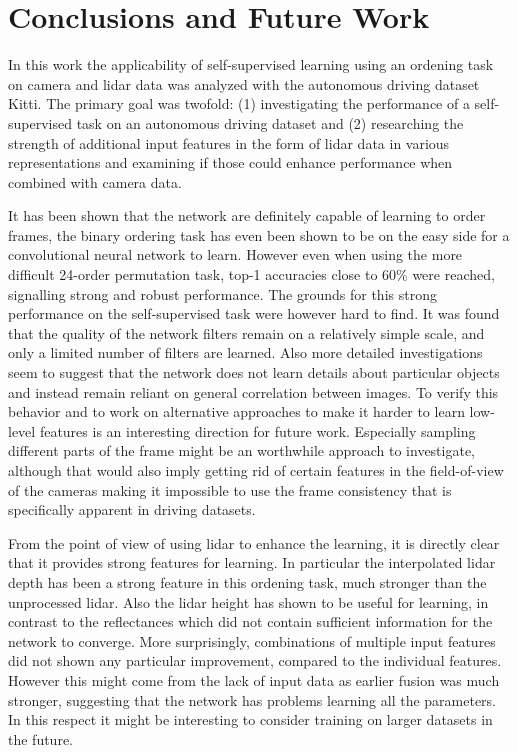 %

\chapter{Conclusions and Future Work}
\label{ch:conclusion}
In this work the applicability of self-supervised learning using an ordening task on camera and lidar data was analyzed with the autonomous driving dataset Kitti\cite{geiger2012}. The primary goal was twofold: (1) investigating the performance of a self-supervised task on an autonomous driving dataset and (2) researching the strength of additional input features in the form of lidar data in various representations and examining if those could enhance performance when combined with camera data.

It has been shown that the network are definitely capable of learning to order frames, the binary ordering task has even been shown to be on the easy side for a convolutional neural network to learn. However even when using the more difficult 24-order permutation task, top-1 accuracies close to 60\% were reached, signalling strong and robust performance. The grounds for this strong performance on the self-supervised task were however hard to find. It was found that the quality of the network filters remain on a relatively simple scale, and only a limited number of filters are learned. Also more detailed investigations seem to suggest that the network does not learn details about particular objects and instead remain reliant on general correlation between images. To verify this behavior and to work on alternative approaches to make it harder to learn low-level features is an interesting direction for future work. Especially sampling different parts of the frame might be an worthwhile approach to investigate, although that would also imply getting rid of certain features in the field-of-view of the cameras making it impossible to use the frame consistency that is specifically apparent in driving datasets.  

From the point of view of using lidar to enhance the learning, it is directly clear that it provides strong features for learning. In particular the interpolated lidar depth has been a strong feature in this ordening task, much stronger than the unprocessed lidar. Also the lidar height has shown to be useful for learning, in contrast to the reflectances which did not contain sufficient information for the network to converge. More surprisingly, combinations of multiple input features did not shown any particular improvement, compared to the individual features. However this might come from the lack of input data as earlier fusion was much stronger, suggesting that the network has problems learning all the parameters. In this respect it might be interesting to consider training on larger datasets in the future.


